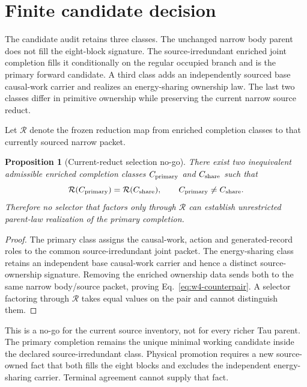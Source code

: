 \documentclass[11pt]{article}
\newtheorem{proposition}{Proposition}
\begin{document}
\section{Finite candidate decision}

The candidate audit retains three classes. The unchanged narrow body parent
does not fill the eight-block signature. The source-irredundant enriched joint
completion fills it conditionally on the regular occupied branch and is the
primary forward candidate. A third class adds an independently sourced base
causal-work carrier and realizes an energy-sharing ownership law. The last two
classes differ in primitive ownership while preserving the current narrow
source reduct.

Let \(\mathcal R\) denote the frozen reduction map from enriched completion
classes to that currently sourced narrow packet.

\begin{proposition}[Current-reduct selection no-go]
There exist two inequivalent admissible enriched completion classes
\(C_{\rm primary}\) and \(C_{\rm share}\) such that
\begin{equation}
 \mathcal R(C_{\rm primary})=\mathcal R(C_{\rm share}),
 \qquad C_{\rm primary}\ne C_{\rm share}.
 \label{eq:w4-counterpair}
\end{equation}
Therefore no selector that factors only through \(\mathcal R\) can establish
unrestricted parent-law realization of the primary completion.
\end{proposition}

\begin{proof}
The primary class assigns the causal-work, action and generated-record roles
to the common source-irredundant joint packet. The energy-sharing class retains
an independent base causal-work carrier and hence a distinct source-ownership
signature. Removing the enriched ownership data sends both to the same narrow
body/source packet, proving Eq.~\eqref{eq:w4-counterpair}. A selector factoring
through \(\mathcal R\) takes equal values on the pair and cannot distinguish
them.
\end{proof}

This is a no-go for the current source inventory, not for every richer Tau
parent. The primary completion remains the unique minimal working candidate
inside the declared source-irredundant class. Physical promotion requires a
new source-owned fact that both fills the eight blocks and excludes the
independent energy-sharing carrier. Terminal agreement cannot supply that
fact.
\end{document}
